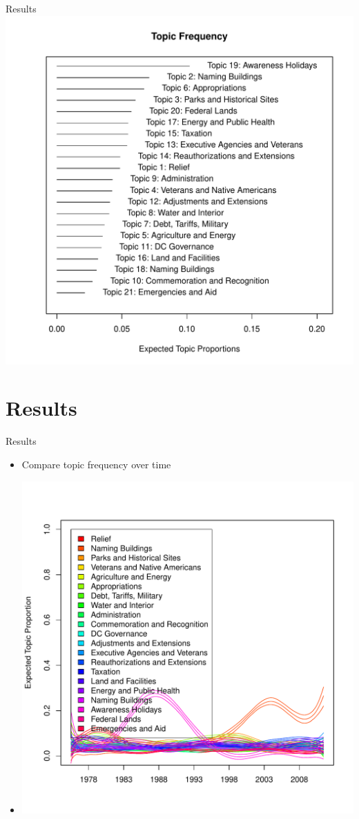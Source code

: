 \documentclass[12pt]{beamer}
\begin{document}
\begin{frame}{Results}
	\includegraphics[scale=.45]{frequency.pdf}
\end{frame}

\section{Results}
\begin{frame}{Results}
	\begin{itemize}
	\item Compare topic frequency over time 
	\item \includegraphics[scale=.4]{effect3.pdf}
	\end{itemize}
\end{frame}
\end{document}
